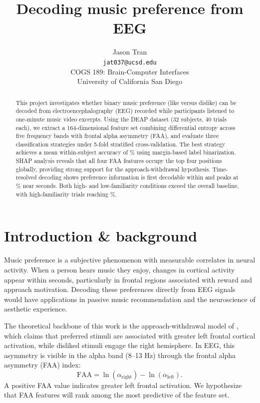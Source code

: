 \documentclass[12pt,letterpaper]{article}
\title{Decoding music preference from EEG}
\author{Jason Tran \\
  {\tt jat037@ucsd.edu} \\[4pt]
  COGS 189: Brain-Computer Interfaces \\
  University of California San Diego}
\begin{document}
\maketitle

\begin{abstract}
This project investigates whether binary music preference (like versus dislike) can be decoded
from electroencephalography (EEG) recorded while participants listened to one-minute music video
excerpts. Using the DEAP dataset (32 subjects, 40 trials each), we extract a 164-dimensional
feature set combining differential entropy across five frequency bands with frontal alpha
asymmetry (FAA), and evaluate three classification strategies under 5-fold stratified
cross-validation. The best strategy achieves a mean within-subject accuracy of \MargMean\%
using margin-based label binarization. SHAP analysis reveals that all four FAA features occupy
the top four positions globally, providing strong support for the approach-withdrawal
hypothesis. Time-resolved decoding shows preference information is first decodable within
\TemporalFirstTime{} and peaks at \TemporalPeakAcc\% near \TemporalPeakTime{} seconds.
Both high- and low-familiarity conditions exceed the overall baseline, with high-familiarity
trials reaching \FamHighAcc\%.
\end{abstract}

\clearpage
\maketoc
\clearpage

\section{Introduction \& background}

Music preference is a subjective phenomenon with measurable correlates in neural activity.
When a person hears music they enjoy, changes in cortical activity appear within seconds,
particularly in frontal regions associated with reward and approach motivation. Decoding these
preferences directly from EEG signals would have applications in passive music recommendation
and the neuroscience of aesthetic experience.

The theoretical backbone of this work is the approach-withdrawal model of
\citet{davidson1992anterior}, which claims that preferred stimuli are associated with greater
left frontal cortical activation, while disliked stimuli engage the right hemisphere. In EEG,
this asymmetry is visible in the alpha band (8--13 Hz) through the frontal alpha asymmetry
(FAA) index:
\[
  \mathrm{FAA} = \ln(\alpha_{\mathrm{right}}) - \ln(\alpha_{\mathrm{left}}).
\]
A positive FAA value indicates greater left frontal activation. We hypothesize that FAA
features will rank among the most predictive of the feature set.
\end{document}

